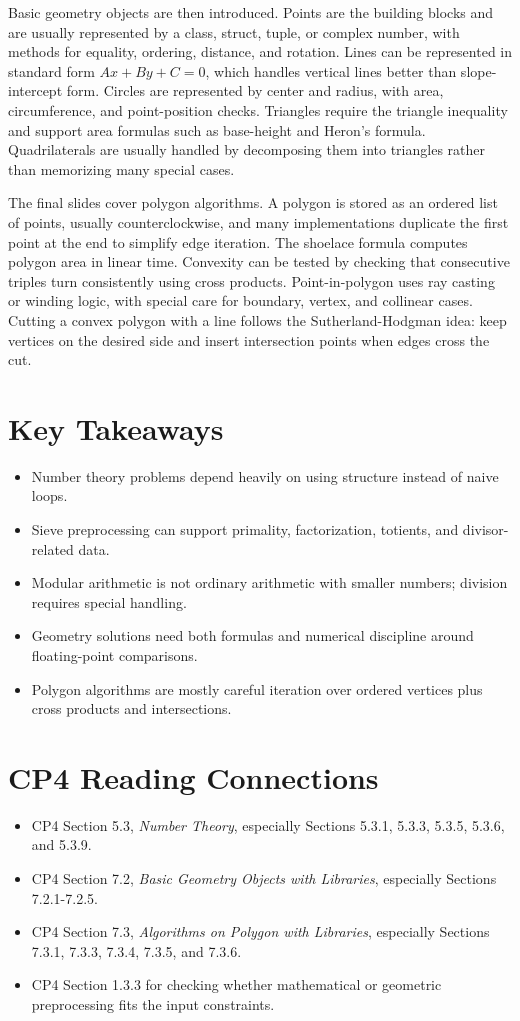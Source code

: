 \documentclass[11pt]{article}
\begin{document}
Basic geometry objects are then introduced. Points are the building blocks and are usually represented by a class, struct, tuple, or complex number, with methods for equality, ordering, distance, and rotation. Lines can be represented in standard form \(Ax+By+C=0\), which handles vertical lines better than slope-intercept form. Circles are represented by center and radius, with area, circumference, and point-position checks. Triangles require the triangle inequality and support area formulas such as base-height and Heron's formula. Quadrilaterals are usually handled by decomposing them into triangles rather than memorizing many special cases.

The final slides cover polygon algorithms. A polygon is stored as an ordered list of points, usually counterclockwise, and many implementations duplicate the first point at the end to simplify edge iteration. The shoelace formula computes polygon area in linear time. Convexity can be tested by checking that consecutive triples turn consistently using cross products. Point-in-polygon uses ray casting or winding logic, with special care for boundary, vertex, and collinear cases. Cutting a convex polygon with a line follows the Sutherland-Hodgman idea: keep vertices on the desired side and insert intersection points when edges cross the cut.

\section*{Key Takeaways}
\begin{itemize}
  \item Number theory problems depend heavily on using structure instead of naive loops.
  \item Sieve preprocessing can support primality, factorization, totients, and divisor-related data.
  \item Modular arithmetic is not ordinary arithmetic with smaller numbers; division requires special handling.
  \item Geometry solutions need both formulas and numerical discipline around floating-point comparisons.
  \item Polygon algorithms are mostly careful iteration over ordered vertices plus cross products and intersections.
\end{itemize}

\section*{CP4 Reading Connections}
\begin{itemize}
  \item CP4 Section 5.3, \textit{Number Theory}, especially Sections 5.3.1, 5.3.3, 5.3.5, 5.3.6, and 5.3.9.
  \item CP4 Section 7.2, \textit{Basic Geometry Objects with Libraries}, especially Sections 7.2.1-7.2.5.
  \item CP4 Section 7.3, \textit{Algorithms on Polygon with Libraries}, especially Sections 7.3.1, 7.3.3, 7.3.4, 7.3.5, and 7.3.6.
  \item CP4 Section 1.3.3 for checking whether mathematical or geometric preprocessing fits the input constraints.
\end{itemize}
\end{document}
